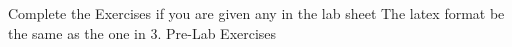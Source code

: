 Complete the Exercises if you are given any in the lab sheet
\newline
\newline
The latex format be the same as the one in 3. Pre-Lab Exercises
